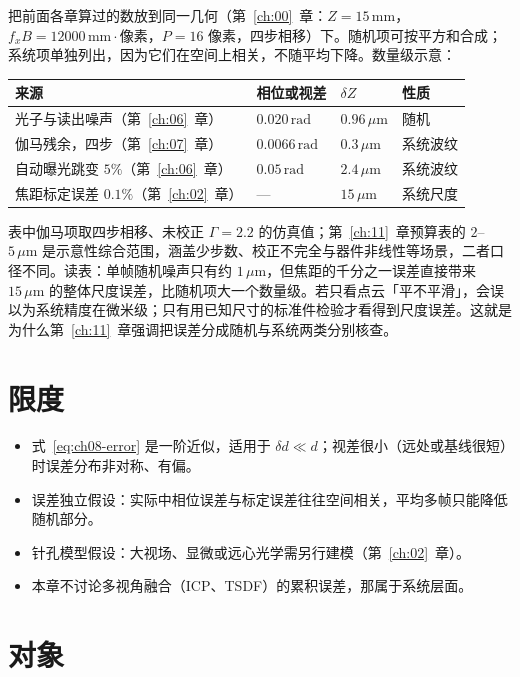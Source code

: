 把前面各章算过的数放到同一几何（第~\ref{ch:00}~章：$Z=15\,\mathrm{mm}$，$f_xB=12000\,\mathrm{mm}\cdot$像素，$P=16$ 像素，四步相移）下。随机项可按平方和合成；系统项单独列出，因为它们在空间上相关，不随平均下降。数量级示意：

\begin{center}
\small
\begin{tabular}{llll}
  \hline
  来源 & 相位或视差 & $\delta Z$ & 性质\\
  \hline
  光子与读出噪声（第~\ref{ch:06}~章） & $0.020\,\mathrm{rad}$ & $0.96\,\mu\mathrm{m}$ & 随机\\
  伽马残余，四步（第~\ref{ch:07}~章） & $0.0066\,\mathrm{rad}$ & $0.3\,\mu\mathrm{m}$ & 系统波纹\\
  自动曝光跳变 $5\%$（第~\ref{ch:06}~章） & $0.05\,\mathrm{rad}$ & $2.4\,\mu\mathrm{m}$ & 系统波纹\\
  焦距标定误差 $0.1\%$（第~\ref{ch:02}~章） & — & $15\,\mu\mathrm{m}$ & 系统尺度\\
  \hline
\end{tabular}
\end{center}

表中伽马项取四步相移、未校正 $\Gamma=2.2$ 的仿真值；第~\ref{ch:11}~章预算表的 $2$--$5\,\mu\mathrm{m}$ 是示意性综合范围，涵盖少步数、校正不完全与器件非线性等场景，二者口径不同。读表：单帧随机噪声只有约 $1\,\mu\mathrm{m}$，但焦距的千分之一误差直接带来 $15\,\mu\mathrm{m}$ 的整体尺度误差，比随机项大一个数量级。若只看点云「平不平滑」，会误以为系统精度在微米级；只有用已知尺寸的标准件检验才看得到尺度误差。这就是为什么第~\ref{ch:11}~章强调把误差分成随机与系统两类分别核查。

\section{限度}
\label{sec:ch07-limits}

\begin{itemize}
  \item 式~\eqref{eq:ch08-error} 是一阶近似，适用于 $\delta d\ll d$；视差很小（远处或基线很短）时误差分布非对称、有偏。
  \item 误差独立假设：实际中相位误差与标定误差往往空间相关，平均多帧只能降低随机部分。
  \item 针孔模型假设：大视场、显微或远心光学需另行建模（第~\ref{ch:02}~章）。
  \item 本章不讨论多视角融合（ICP、TSDF）的累积误差，那属于系统层面。
\end{itemize}

\section{对象}
\label{sec:ch07-object}

